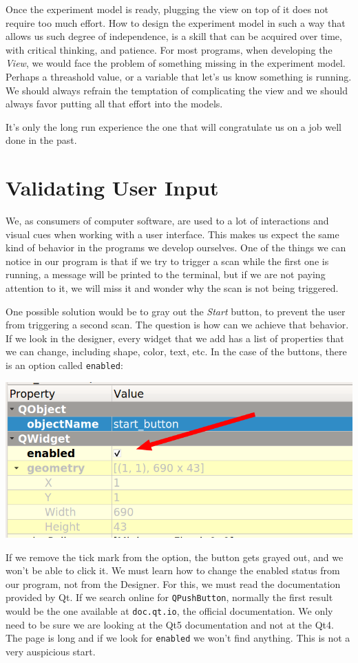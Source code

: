Once the experiment model is ready, plugging the view on top of it does not require too much effort. How to design the experiment model in such a way that allows us such degree of independence, is a skill that can be acquired over time, with critical thinking, and patience. For most programs, when developing the \emph{View}, we would face the problem of something missing in the experiment model. Perhaps a threashold value, or a variable that let's us know something is running. We should always refrain the temptation of complicating the view and we should always favor putting all that effort into the models.

It's only the long run experience the one that will congratulate us on a job well done in the past.

\section{Validating User Input}\label{sec:validating-user-input}
We, as consumers of computer software, are used to a lot of interactions and visual cues when working with a user interface. This makes us expect the same kind of behavior in the programs we develop ourselves. One of the things we can notice in our program is that if we try to trigger a scan while the first one is running, a message will be printed to the terminal, but if we are not paying attention to it, we will miss it and wonder why the scan is not being triggered.

One possible solution would be to gray out the \emph{Start} button, to prevent the user from triggering a second scan. The question is how can we achieve that behavior. If we look in the designer, every widget that we add has a list of properties that we can change, including shape, color, text, etc. In the case of the buttons, there is an option called \texttt{enabled}:

\begin{center}
    \includegraphics[width=.4\linewidth]{images/Chapter_09/10_enabled_button.png}
\end{center}

If we remove the tick mark from the option, the button gets grayed out, and we won't be able to click it. We must learn how to change the enabled status from our program, not from the Designer. For this, we must read the documentation provided by Qt. If we search online for \texttt{QPushButton}, normally the first result would be the one available at \texttt{doc.qt.io}, the official documentation. We only need to be sure we are looking at the Qt5 documentation and not at the Qt4. The page is long and if we look for \texttt{enabled} we won't find anything. This is not a very auspicious start.

